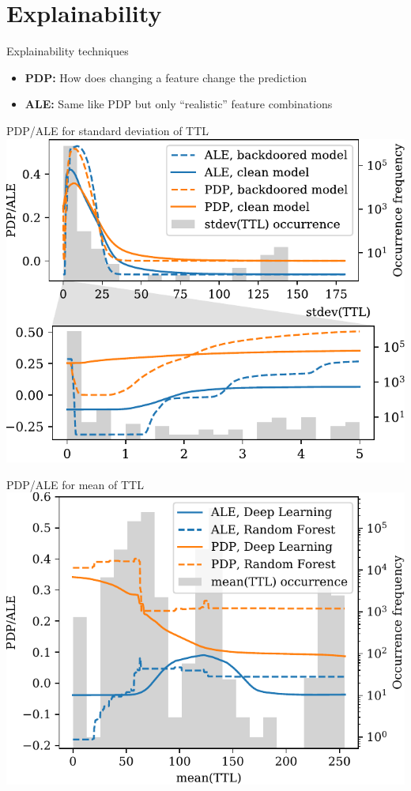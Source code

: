 \documentclass[xcolor={dvipsnames}]{beamer}
\begin{document}
\section{Explainability}
\begin{frame}{Explainability techniques}
\begin{itemize}
\item \textbf{PDP:} How does changing a feature change the prediction
\item \textbf{ALE:} Same like PDP but only ``realistic'' feature combinations
\end{itemize}
\end{frame}

\begin{frame}{PDP/ALE for standard deviation of TTL}
\centering
\includegraphics[width=0.8\columnwidth]{figures/pdpale2017nn_joint_2.pdf}
\end{frame}

\begin{frame}{PDP/ALE for mean of TTL}
\centering
\includegraphics[width=0.8\columnwidth]{figures/ttlmean.pdf}
\end{frame}
\end{document}
